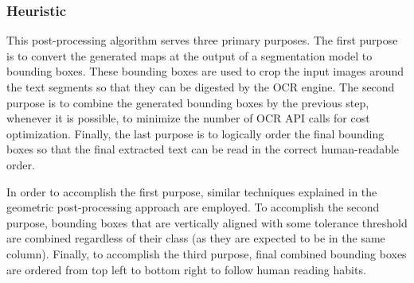 \documentclass[letterpaper]{article} %
\begin{document}


 


\subsubsection{Heuristic}

This post-processing algorithm serves three primary purposes. The first purpose is to convert the generated maps at the output of a segmentation model to bounding boxes. These bounding boxes are used to crop the input images around the text segments so that they can be digested by the OCR engine. The second purpose is to combine the generated bounding boxes by the previous step, whenever it is possible, to minimize the number of OCR API calls for cost optimization. Finally, the last purpose is to logically order the final bounding boxes so that the final extracted text can be read in the correct human-readable order.

In order to accomplish the first purpose, similar techniques explained in the geometric post-processing approach are employed.
To accomplish the second purpose, bounding boxes that are vertically aligned with some tolerance threshold are combined regardless of their class (as they are expected to be in the same column). Finally, to accomplish the third purpose, final combined bounding boxes are ordered from top left to bottom right to follow human reading habits.
\end{document}
